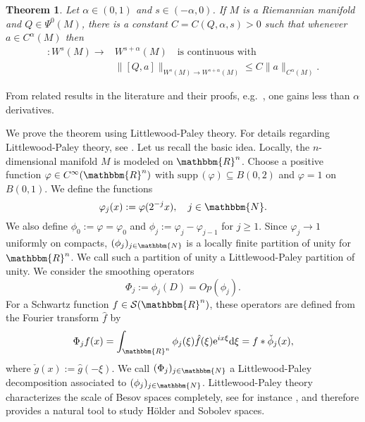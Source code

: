 \documentclass[10pt]{amsart}
\newtheorem{thm}{Theorem}[section]
\theoremstyle{remark}
\theoremstyle{definition}
\begin{document}
\begin{thm}
\label{sobregthm}
Let $\alpha\in(0,1)$ and $s\in (-\alpha,0)$. If $M$ is a Riemannian manifold and $Q\in \Psi^0(M)$, there is a constant $C=C(Q,\alpha,s)>0$ such that whenever $a\in C^\alpha(M)$ then
\begin{align*}
[Q,a]:W^s(M)\to &W^{s+\alpha}(M)\quad\mbox{is continuous with}\\
&\|[Q,a]\|_{W^s(M)\to W^{s+\alpha}(M)}\leq C\|a\|_{C^\alpha(M)}.
\end{align*}
\end{thm}
\begin{rm}
From related results in the literature and their proofs, e.g.~\cite{abels,marschallcpde}, one gains less than $\alpha$ derivatives.
\end{rm}
We prove the theorem using Littlewood-Paley theory. For details regarding Littlewood-Paley theory, see \cite{toolspde}. Let us recall the basic idea. 
\label{lpdiscussion}
Locally, the $n$-dimensional manifold $M$ is modeled on ${\mathbbm{R}}^n$. Choose a positive function $\varphi\in C^\infty({\mathbbm{R}}^{n})$ with ${\mathrm{s} \mathrm{u} \mathrm{p} \mathrm{p}\,}(\varphi)\subseteq B(0,2)$ and $\varphi=1$ on $B(0,1)$. We define the functions
$$\varphi_{j}(x):=\varphi(2^{-j}x),\quad j\in {\mathbbm{N}}.$$
We also define $\phi_{0}:=\varphi=\varphi_{0}$ and $\phi_{j}:=\varphi_{j}-\varphi_{j-1}$ for $j\geq 1$. Since $\varphi_{j}\to 1$ uniformly on compacts, $(\phi_{j})_{j\in {\mathbbm{N}}}$ is a locally finite partition of unity for ${\mathbbm{R}}^{n}$. We call such a partition of unity a Littlewood-Paley partition of unity. We consider the smoothing operators 
$$\Phi_{j}:=\phi_j(D)=Op(\phi_{j}).$$ 
For a Schwartz function $f\in \mathcal{S}({\mathbbm{R}}^{n})$, these operators are defined from the Fourier transform $\hat{f}$ by 
$$\Phi_{j}f(x)=\int_{{\mathbbm{R}}^n} \phi_j(\xi)\hat{f}(\xi){\mathrm{e}}^{ix\xi}{\mathrm{d}} \xi=f* \check{\phi}_j(x),$$ 
where $\check{g}(x):=\hat{g}(-\xi)$. We call $(\Phi_j)_{j\in {\mathbbm{N}}}$ a Littlewood-Paley decomposition associated to $(\phi_{j})_{j\in {\mathbbm{N}}}$. Littlewood-Paley theory characterizes the scale of Besov spaces completely, see for instance \cite{abelsbook}, and therefore provides a natural tool to study H\"older and Sobolev spaces.
\end{document}
